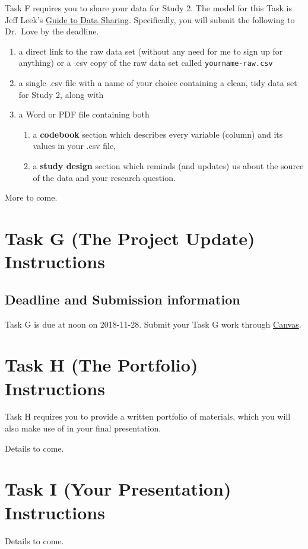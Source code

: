 \documentclass[]{book}
\providecommand{\tightlist}{%
  \setlength{\itemsep}{0pt}\setlength{\parskip}{0pt}}
\theoremstyle{definition}
\theoremstyle{definition}
\theoremstyle{definition}
\theoremstyle{remark}
\begin{document}
Task F requires you to share your data for Study 2. The model for this
Task is Jeff Leek's \href{https://github.com/jtleek/datasharing}{Guide
to Data Sharing}. Specifically, you will submit the following to
Dr.~Love by the deadline.

\begin{enumerate}
\def\labelenumi{\arabic{enumi}.}
\tightlist
\item
  a direct link to the raw data set (without any need for me to sign up
  for anything) or a .csv copy of the raw data set called
  \texttt{yourname-raw.csv}
\item
  a single .csv file with a name of your choice containing a clean, tidy
  data set for Study 2, along with
\item
  a Word or PDF file containing both

  \begin{enumerate}
  \def\labelenumii{\alph{enumii}.}
  \tightlist
  \item
    a \textbf{codebook} section which describes every variable (column)
    and its values in your .csv file,
  \item
    a \textbf{study design} section which reminds (and updates) us about
    the source of the data and your research question.
  \end{enumerate}
\end{enumerate}

More to come.

\hypertarget{taskG}{%
\chapter{Task G (The Project Update) Instructions}\label{taskG}}

\hypertarget{deadline-and-submission-information-6}{%
\section{Deadline and Submission
information}\label{deadline-and-submission-information-6}}

Task G is due at noon on 2018-11-28. Submit your Task G work through
\href{https://canvas.case.edu/}{Canvas}.

\hypertarget{taskH}{%
\chapter{Task H (The Portfolio) Instructions}\label{taskH}}

Task H requires you to provide a written portfolio of materials, which
you will also make use of in your final presentation.

Details to come.

\hypertarget{taskI}{%
\chapter{Task I (Your Presentation) Instructions}\label{taskI}}

Details to come.


\end{document}
